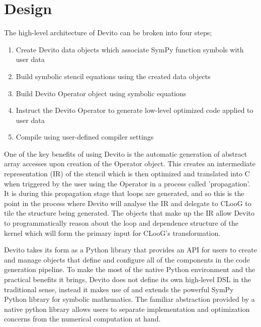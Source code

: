 \documentclass[a4paper,12pt,twoside]{report}
\begin{document}
\section*{Design}
The high-level architecture of Devito can be broken into four steps;
\begin{enumerate}
    \item Create Devito data objects which associate SymPy function symbols with user data
    \item Build symbolic stencil equations using the created data objects
    \item Build Devito Operator object using symbolic equations
    \item Instruct the Devito Operator to generate low-level optimized code applied to user data
    \item Compile using user-defined compiler settings
\end{enumerate}
One of the key benefits of using Devito is the automatic generation of abstract array accesses upon creation of the Operator object. This 
creates an intermediate representation (IR) of the stencil which is then optimized and translated into C when triggered by the user using the Operator
in a process called 'propagation'. It is during this propagation stage that loops are generated, and so this is the point in the process where
Devito will analyse the IR and delegate to CLooG to tile the structure being generated. The objects that make up the IR allow
Devito to programmatically reason about the loop and dependence structure of the kernel which will form the primary input for CLooG's transformation.

Devito takes its form as a Python library that provides an API for users to create and manage objects that define and configure all of the components
in the code generation pipeline. To make the most of the native Python environment and the practical benefits it brings, Devito does not define its 
own high-level DSL in the traditional sense, instead it makes use of and extends the powerful SymPy Python library for symbolic mathematics. 
The familiar abstraction provided by a native python library allows users to separate implementation and optimization concerns from the numerical computation at hand.

\end{document}
